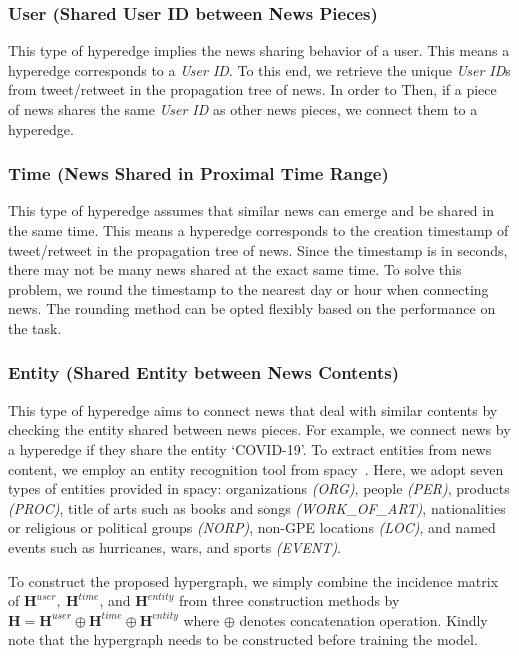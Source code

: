 \documentclass[conference]{IEEEtran}
\begin{document}
\subsubsection{\textbf{User} (Shared User ID between News Pieces)} This type of hyperedge implies the news sharing behavior of a user. This means a hyperedge corresponds to a \textit{User ID}. To this end, we retrieve the unique \textit{User ID}s from tweet/retweet in the propagation tree of news. In order to Then, if a piece of news shares the same \textit{User ID} as other news pieces, we connect them to a hyperedge.
\hfill\\


\subsubsection{\textbf{Time} (News Shared in Proximal Time Range)}
This type of hyperedge assumes that similar news can emerge and be shared in the same time. This means a hyperedge corresponds to the creation timestamp of tweet/retweet in the propagation tree of news. Since the timestamp is in seconds, there may not be many news shared at the exact same time. To solve this problem, we round the timestamp to the nearest day or hour when connecting news. The rounding method can be opted flexibly based on the performance on the task.
\hfill\\


\subsubsection{\textbf{Entity} (Shared Entity between News Contents)} This type of hyperedge aims to connect news that deal with similar contents by checking the entity shared between news pieces. For example, we connect news by a hyperedge if they share the entity `COVID-19'. To extract entities from news content, we employ an entity recognition tool from spacy~\cite{honnibal2017spacy}. Here, we adopt seven types of entities provided in spacy: organizations \textit{(ORG)}, people \textit{(PER)}, products \textit{(PROC)}, title of arts such as books and songs \textit{(WORK\_OF\_ART)}, nationalities or religious or political groups \textit{(NORP)}, non-GPE locations \textit{(LOC)}, and named events such as hurricanes, wars, and sports \textit{(EVENT)}.

\hfill

To construct the proposed hypergraph, we simply combine the incidence matrix of $\mathbf{H}^{user},\:\mathbf{H}^{time}$, and $\mathbf{H}^{entity}$ from three construction methods by $\mathbf{H} = \mathbf{H}^{user} \oplus \mathbf{H}^{time} \oplus \mathbf{H}^{entity}$ where $\oplus$ denotes concatenation operation. Kindly note that the hypergraph needs to be constructed before training the model.
\end{document}
